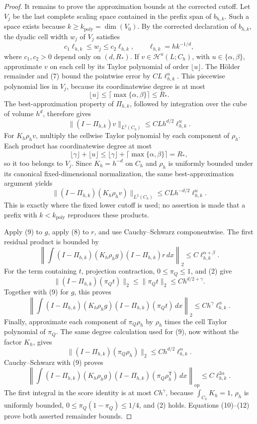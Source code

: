\documentclass{article}
\begin{document}
\begin{proof}
It remains to prove the approximation bounds at the corrected cutoff.  Let \(V_j\) be the last complete scaling space contained in the prefix span of \(b_{h,k}\).  Such a space exists because \(k\ge k_{\mathrm{poly}}=\dim(V_0)\).  By the corrected declaration of \(b_{h,k}\), the dyadic cell width \(w_j\) of \(V_j\) satisfies
\[
 c_1\ell_{h,k}\le w_j\le c_2\ell_{h,k},
 \qquad \ell_{h,k}=hk^{-1/d},
\tag{7}
\]
where \(c_1,c_2>0\) depend only on \((d,R_*)\).  If \(v\in\mathcal H^u(L;C_h)\), with \(u\in\{\alpha,\beta\}\), approximate \(v\) on each cell by its Taylor polynomial of order \(\lfloor u\rfloor\).  The H\"older remainder and (7) bound the pointwise error by \(CL\ell_{h,k}^u\).  This piecewise polynomial lies in \(V_j\), because its coordinatewise degree is at most
\[
 \lfloor u\rfloor\le\lceil\max\{\alpha,\beta\}\rceil\le R_*.
\]
The best-approximation property of \(\Pi_{h,k}\), followed by integration over the cube of volume \(h^d\), therefore gives
\[
 \lVert(I-\Pi_{h,k})v\rVert_{L^2(C_h)}
 \le CLh^{d/2}\ell_{h,k}^u.
\tag{8}
\]
For \(K_h\rho_hv\), multiply the cellwise Taylor polynomial by each component of \(\rho_h\).  Each product has coordinatewise degree at most
\[
 \lfloor\gamma\rfloor+\lfloor u\rfloor
 \le\lfloor\gamma\rfloor+\lceil\max\{\alpha,\beta\}\rceil=R_*,
\]
so it too belongs to \(V_j\).  Since \(K_h=h^{-d}\) on \(C_h\) and \(\rho_h\) is uniformly bounded under its canonical fixed-dimensional normalization, the same best-approximation argument yields
\[
 \lVert(I-\Pi_{h,k})(K_h\rho_hv)\rVert_{L^2(C_h)}
 \le CLh^{-d/2}\ell_{h,k}^u.
\tag{9}
\]
This is exactly where the fixed lower cutoff is used; no assertion is made that a prefix with \(k<k_{\mathrm{poly}}\) reproduces these products.

Apply (9) to \(g\), apply (8) to \(r\), and use Cauchy--Schwarz componentwise.  The first residual product is bounded by
\[
 \left\lVert\int (I-\Pi_{h,k})(K_h\rho_hg)
                  (I-\Pi_{h,k})r\,dx\right\rVert_2
 \le C\ell_{h,k}^{\alpha+\beta}.
\tag{10}
\]
For the term containing \(t\), projection contraction, \(0\le\pi_Q\le1\), and (2) give
\[
 \lVert(I-\Pi_{h,k})(\pi_Qt)\rVert_2
 \le\lVert\pi_Qt\rVert_2\le Ch^{d/2+\gamma}.
\]
Together with (9) for \(g\), this proves
\[
 \left\lVert\int (I-\Pi_{h,k})(K_h\rho_hg)
                  (I-\Pi_{h,k})(\pi_Qt)\,dx\right\rVert_2
 \le Ch^\gamma\ell_{h,k}^\alpha.
\tag{11}
\]
Finally, approximate each component of \(\pi_Q\rho_h\) by \(\rho_h\) times the cell Taylor polynomial of \(\pi_Q\).  The same degree calculation used for (9), now without the factor \(K_h\), gives
\[
 \lVert(I-\Pi_{h,k})(\pi_Q\rho_h)\rVert_2
 \le Ch^{d/2}\ell_{h,k}^\alpha.
\]
Cauchy--Schwarz with (9) proves
\[
 \left\lVert\int (I-\Pi_{h,k})(K_h\rho_hg)
                  (I-\Pi_{h,k})(\pi_Q\rho_h^{\mathsf T})\,dx
 \right\rVert_{\mathrm{op}}
 \le C\ell_{h,k}^{2\alpha}.
\tag{12}
\]
The first integral in the score identity is at most \(Ch^\gamma\), because \(\int_{C_h}K_h=1\), \(\rho_h\) is uniformly bounded, \(0\le\pi_Q(1-\pi_Q)\le1/4\), and (2) holds.  Equations (10)--(12) prove both asserted remainder bounds.


\end{proof}
\end{document}
